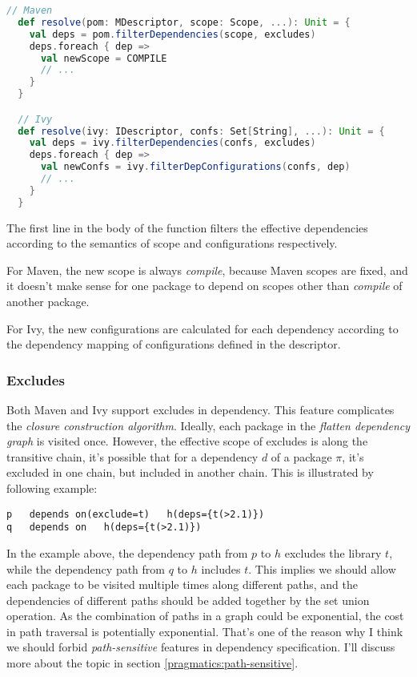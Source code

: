 \begin{lstlisting}[language=Scala]
  // Maven
  def resolve(pom: MDescriptor, scope: Scope, ...): Unit = {
    val deps = pom.filterDependencies(scope, excludes)
    deps.foreach { dep =>
      val newScope = COMPILE
      // ...
    }
  }

  // Ivy
  def resolve(ivy: IDescriptor, confs: Set[String], ...): Unit = {
    val deps = ivy.filterDependencies(confs, excludes)
    deps.foreach { dep =>
      val newConfs = ivy.filterDepConfigurations(confs, dep)
      // ...
    }
  }
\end{lstlisting}

The first line in the body of the function filters the effective dependencies according to the semantics of scope and configurations respectively.

For Maven, the new scope is always \emph{compile}, because Maven scopes are fixed, and it doesn't make sense for one package to depend on scopes other than \emph{compile} of another package.

For Ivy, the new configurations are calculated for each dependency according to the dependency mapping of configurations defined in the descriptor.

\subsubsection{Excludes}

\label{sat:excludes}

Both Maven and Ivy support excludes in dependency. This feature complicates the \emph{closure construction algorithm}. Ideally, each package in the \emph{flatten dependency graph} is visited once. However, the effective scope of excludes is along the transitive chain, it's possible that for a dependency $d$ of a package $\pi$, it's excluded in one chain, but included in another chain. This is illustrated by following example:

\begin{verbatim}
p   depends on(exclude=t)   h(deps={t(>2.1)})
q   depends on   h(deps={t(>2.1)})
\end{verbatim}

In the example above, the dependency path from $p$ to $h$ excludes the library $t$, while the dependency path from $q$ to $h$ includes $t$. This implies we should allow each package to be visited multiple times along different paths, and the dependencies of different paths should be added together by the set union operation. As the combination of paths in a graph could be exponential, the cost in path traversal is potentially exponential. That's one of the reason why I think we should forbid \emph{path-sensitive} features in dependency specification. I'll discuss more about the topic in section \ref{pragmatics:path-sensitive}.

